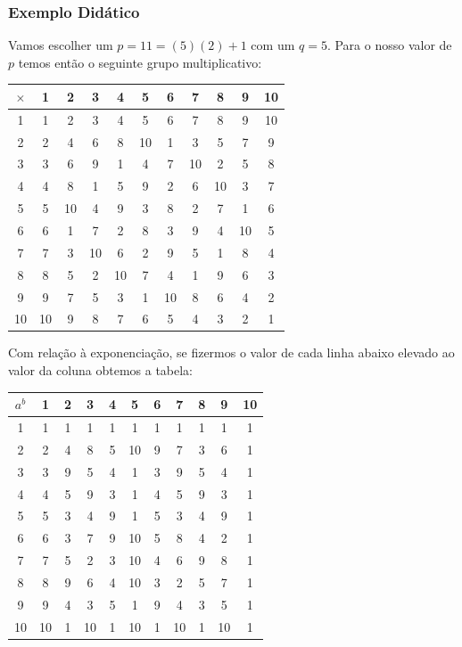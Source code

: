 \documentclass[a4paper]{article}
\begin{document}



  

\subsubsection{Exemplo Didático}

Vamos escolher um $p=11=(5)(2)+1$ com um $q=5$. Para o nosso valor de
$p$ temos então o seguinte grupo multiplicativo:

\begin{tabular}{|c||c|c|c|c|c|c|c|c|c|c|}
  \hline
$\times$&1&2&3&4&5&6&7&8&9&10\\
  \hline
  \hline
1&1&2&3&4&5&6&7&8&9&10\\
\hline
2&2&4&6&8&10&1&3&5&7&9\\
\hline
3&3&6&9&1&4&7&10&2&5&8\\
\hline
4&4&8&1&5&9&2&6&10&3&7\\
\hline
5&5&10&4&9&3&8&2&7&1&6\\
\hline
6&6&1&7&2&8&3&9&4&10&5\\
\hline
7&7&3&10&6&2&9&5&1&8&4\\
\hline
8&8&5&2&10&7&4&1&9&6&3\\
\hline
9&9&7&5&3&1&10&8&6&4&2\\
\hline
10&10&9&8&7&6&5&4&3&2&1\\
\hline
\end{tabular}

Com relação à exponenciação, se fizermos o valor de cada linha abaixo
elevado ao valor da coluna obtemos a tabela:

\begin{tabular}{|c||c|c|c|c|c|c|c|c|c|c|}
  \hline
  $a^b$&1&2&3&4&5&6&7&8&9&10\\
  \hline
  \hline
1&1&1&1&1&1&1&1&1&1&1\\
\hline
2&2&4&8&5&10&9&7&3&6&1\\
\hline
3&3&9&5&4&1&3&9&5&4&1\\
\hline
4&4&5&9&3&1&4&5&9&3&1\\
\hline
5&5&3&4&9&1&5&3&4&9&1\\
\hline
6&6&3&7&9&10&5&8&4&2&1\\
\hline
7&7&5&2&3&10&4&6&9&8&1\\
\hline
8&8&9&6&4&10&3&2&5&7&1\\
\hline
9&9&4&3&5&1&9&4&3&5&1\\
\hline
10&10&1&10&1&10&1&10&1&10&1\\
\hline
\end{tabular}
\end{document}

